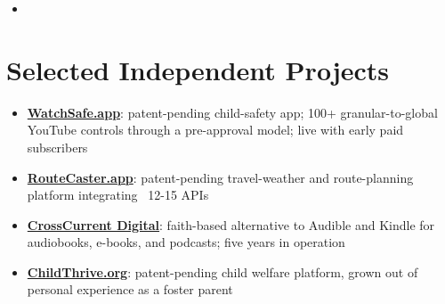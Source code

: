 \documentclass[11pt,a4paper,sans]{moderncv}
\begin{document}
\begin{itemize}
\vspace{3pt}

\item{}

\end{itemize}


\section{Selected Independent Projects}
\vspace{1pt}
\begin{itemize}

\item \textbf{\href{https://watchsafe.app}{WatchSafe.app}}: patent-pending child-safety app; 100+ granular-to-global YouTube controls through a pre-approval model; live with early paid subscribers

\item \textbf{\href{https://routecaster.app}{RouteCaster.app}}: patent-pending travel-weather and route-planning platform integrating ~12-15 APIs

\item \textbf{\href{https://crosscurrentdigital.com}{CrossCurrent Digital}}: faith-based alternative to Audible and Kindle for audiobooks, e-books, and podcasts; five years in operation

\item \textbf{\href{https://childthrive.org}{ChildThrive.org}}: patent-pending child welfare platform, grown out of personal experience as a foster parent

\end{itemize}

\end{document}
